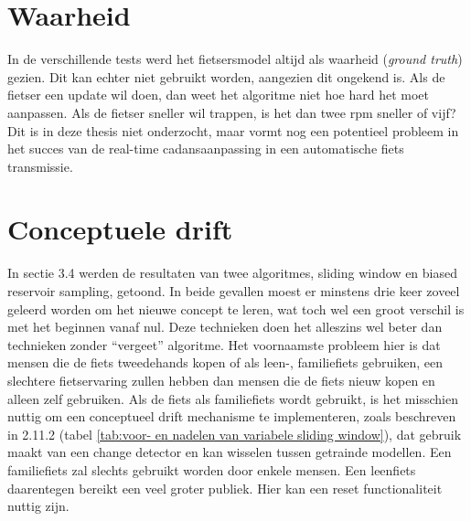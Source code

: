 \section{Waarheid}
In de verschillende tests werd het fietsersmodel altijd als waarheid (\textit{ground truth}) gezien. Dit kan echter niet gebruikt worden, aangezien dit ongekend is. Als de fietser een update wil doen, dan weet het algoritme niet hoe hard het moet aanpassen. Als de fietser sneller wil trappen, is het dan twee rpm sneller of vijf? Dit is in deze thesis niet onderzocht, maar vormt nog een potentieel probleem in het succes van de real-time cadansaanpassing in een automatische fiets transmissie.
\section{Conceptuele drift}
In sectie 3.4 werden de resultaten van twee algoritmes, sliding window en biased reservoir sampling, getoond. In beide gevallen moest er minstens drie keer zoveel geleerd worden om het nieuwe concept te leren, wat toch wel een groot verschil is met het beginnen vanaf nul. Deze technieken doen het alleszins wel beter dan technieken zonder “vergeet” algoritme. Het voornaamste probleem hier is dat mensen die de fiets tweedehands kopen of als leen-, familiefiets gebruiken, een slechtere fietservaring zullen hebben dan mensen die de fiets nieuw kopen en alleen zelf gebruiken. Als de fiets als familiefiets wordt gebruikt, is het misschien nuttig om een conceptueel drift mechanisme te implementeren, zoals beschreven in 2.11.2 (tabel \ref{tab:voor- en nadelen van variabele sliding window}), dat gebruik maakt van een change detector en kan wisselen tussen getrainde modellen. Een familiefiets zal slechts gebruikt worden door enkele mensen. Een leenfiets daarentegen bereikt een veel groter publiek. Hier kan een reset functionaliteit nuttig zijn.
